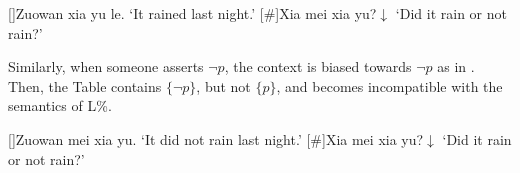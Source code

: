 \documentclass[output=paper,colorlinks,citecolor=brown]{langscibook}
\begin{document}
\ea\label{posbana}
\begin{xlist}
[]{Zuowan xia yu le.
\glt `It rained last night.'}
[\#]{Xia mei xia yu?$\downarrow$
\glt `Did it rain or not rain?' }
\end{xlist}
\z


Similarly, when someone asserts $\neg p$, the context is biased towards $\neg p$ as in .  Then, the Table contains $\{\neg p\}$, but not $\{p\}$, and becomes incompatible with the semantics of L\%.

\ea\label{meiana}
\begin{xlist}
[]{Zuowan mei xia yu. 
\glt `It did not rain last night.'}
[\#]{Xia mei xia yu?$\downarrow$
\glt `Did it rain or not rain?' } 
\end{xlist}
\z


	
	
\end{document}
